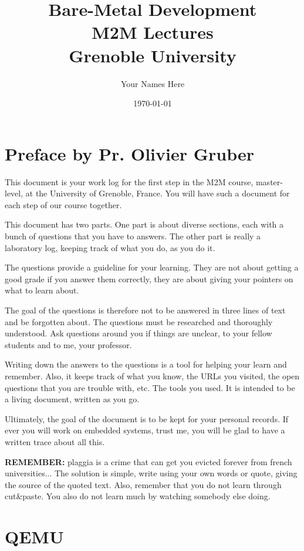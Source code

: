 \documentclass[10]{article}
\begin{document}
\title{Bare-Metal Development \\
M2M Lectures\\
Grenoble University}
\author{Your Names Here}
\date{\today}
\maketitle

\section{Preface by Pr. Olivier Gruber}

This document is your work log for the first step in the 
M2M course, master-level, at the University of Grenoble, France.
You will have such a document for each step of our course
together.

This document has two parts. One part is about diverse
sections, each with a bunch of questions 
that you have to answers. The other part is really 
a laboratory log, keeping track of what you do, 
as you do it.

The questions provide a guideline for your learning. 
They are not about getting a good grade if you answer them
correctly, they are about giving your pointers on what to 
learn about.

The goal of the questions is therefore not to be answered 
in three lines of text and be forgotten about. The questions
must be researched and thoroughly understood. Ask questions
around you if things are unclear, to your fellow students
and to me, your professor. 

Writing down the answers to the questions is a tool for helping
your learn and remember. Also, it keeps track of what you know,
the URLs you visited, the open questions that you are trouble with,
etc. The tools you used. It is intended to be a living document,
written as you go.

Ultimately, the goal of the document is to be kept for 
your personal records. If ever you will work on embedded
systems, trust me, you will be glad to have a written 
trace about all this.

{\bf REMEMBER:} plaggia is a crime that can get you evicted
forever from french universities... The solution is simple,
write using your own words or quote, giving the source of
the quoted text. Also, remember that you do not learn through
cut\&paste. You also do not learn much by watching somebody else
doing.

\section{QEMU}
\end{document}
